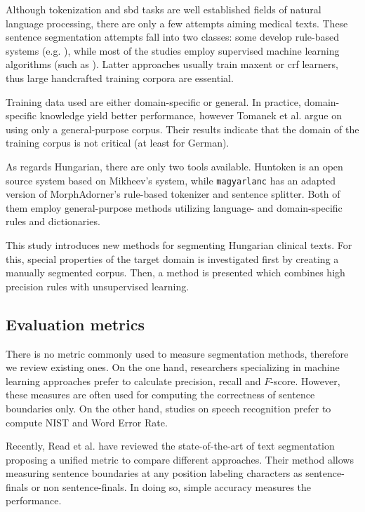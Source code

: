 Although tokenization and \acrshort{sbd} tasks are well established fields of natural language processing, there are only a few attempts aiming medical texts. 
These sentence segmentation attempts fall into two classes: some develop rule-based systems (e.g. \cite{XuSDJWD10}), while most of the studies employ supervised machine learning algorithms (such as \cite{apostolova2009automatic,cho2002text,Savova2010,taira2001automatic,tomanek2007sentence}).
Latter approaches usually train \acrlong{maxent} or \acrshort{crf} learners, thus large handcrafted training corpora are essential. 

Training data used are either domain-specific or general. 
In practice, domain-specific knowledge yield better performance, however Tomanek et al.  \cite{tomanek2006reappraisal} argue on using only a general-purpose corpus. 
Their results indicate that the domain of the training corpus is not critical (at least for German).

As regards Hungarian, there are only two tools available. 
Huntoken \cite{Halacsy2004} is an open source system based on Mikheev’s system, while \texttt{magyarlanc} \cite{zsibrata2013magyarlanc} has an adapted version of MorphAdorner’s rule-based tokenizer \cite{kumar2009monk} and sentence splitter. 
Both of them employ general-purpose methods utilizing language- and domain-specific rules and dictionaries.

This study introduces new methods for segmenting Hungarian clinical texts.
For this, special properties of the target domain is investigated first by creating a manually segmented corpus. 
Then, a method is presented which combines high precision rules with unsupervised learning.

\subsection{Evaluation metrics}
\label{sec:metric}

There is no metric commonly used to measure segmentation methods, therefore we review existing ones.
On the one hand, researchers specializing in machine learning approaches prefer to calculate precision, recall and $F$-score. 
However, these measures are often used for computing the correctness of sentence boundaries only.
On the other hand, studies on speech recognition prefer to compute NIST and Word Error Rate. 

Recently, Read et al. have reviewed \cite{read2012sentence} the state-of-the-art of text segmentation proposing a unified metric to compare different approaches. 
Their method allows measuring sentence boundaries at any position labeling characters as sentence-finals or non sentence-finals. 
In doing so, simple accuracy measures the performance. 

